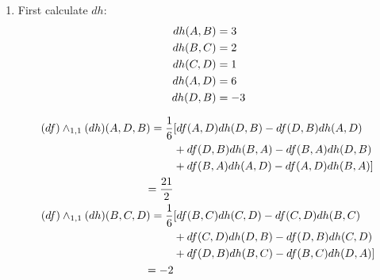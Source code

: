 \documentclass{article}
\begin{document}
\begin{enumerate}[label=(\alph*)]
    \item 
    First calculate $dh$:
    \begin{align}
        dh(A, B) &= 3 \notag\\
        dh(B, C) &= 2 \notag\\
        dh(C, D) &= 1 \notag\\
        dh(A, D) &= 6 \notag\\
        dh(D, B) &= -3 \notag
    \end{align}
    
    \begin{align}
        (df) \wedge_{1, 1} (dh) (A, D, B) = \frac16 &[df(A, D)dh(D, B) - df(D, B)dh(A, D) \notag\\
                &+ df(D, B)dh(B, A) - df(B, A)dh(D, B)  \notag\\
                &+ df(B, A)dh(A, D) - df(A, D)dh(B, A)] \notag\\
        = \frac{21}{2} \notag\\
        (df) \wedge_{1, 1} (dh) (B, C, D) = \frac16 &[df(B, C)dh(C, D) - df(C, D)dh(B, C) \notag\\
                &+ df(C, D)dh(D, B) - df(D, B)dh(C, D)  \notag\\
                &+ df(D, B)dh(B, C) - df(B, C)dh(D, A)] \notag\\
        = -2 \notag
    \end{align}
\end{enumerate}


\vspace{1.8cm}
\\\\
\end{document}

